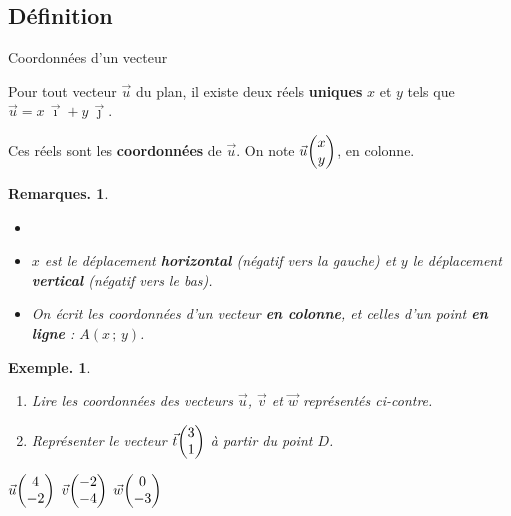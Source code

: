 \documentclass[12pt]{article}
\theoremstyle{break}
\newtheorem*{example}{Exemple.}
\newtheorem*{remarks}{Remarques.}
\begin{document}
\subsection{Définition}

\begin{definition}{Coordonnées d'un vecteur}{}
  \begin{multihide}
  Pour tout vecteur $\vec u$ du plan, il existe deux réels \textbf{uniques} $x$ et $y$ tels que $\vec u = x\,\vec\imath + y\,\vec\jmath$.

  Ces réels sont les \textbf{coordonnées} de $\vec u$. On note $\vec u\col{x}{y}$, en colonne.
  \end{multihide}
\end{definition}

\begin{remarks}
  \begin{itemize}
    \item[]
    \item $x$ est le déplacement \textbf{horizontal} (négatif vers la gauche) et $y$ le déplacement \textbf{vertical} (négatif vers le bas).
    \item On écrit les coordonnées d'un vecteur \textbf{en colonne}, et celles d'un point \textbf{en ligne} : $A(x\,;\,y)$.
  \end{itemize}
\end{remarks}

\begin{example}
  \begin{minipage}{0.45\linewidth}
    \begin{enumerate}[label=\arabic*.]
      \item Lire les coordonnées des vecteurs $\vec u$, $\vec v$ et $\vec w$ représentés ci-contre.
      \item Représenter le vecteur $\vec t\col{3}{1}$ à partir du point $D$.
    \end{enumerate}
    \begin{reponse}
      $\vec u\col{4}{-2}$ \qquad $\vec v\col{-2}{-4}$ \qquad $\vec w\col{0}{-3}$
    \end{reponse}
  \end{minipage}
  \hfill
  \begin{minipage}{0.52\linewidth}
    \begin{center}
    \end{center}
  \end{minipage}
\end{example}
\end{document}
